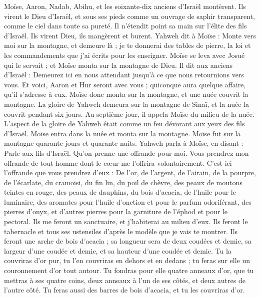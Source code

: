 \begin{multicols}{2}
Moïse, Aaron, Nadab, Abihu, et les soixante-dix anciens d'Israël montèrent.
Ils virent le Dieu d'Israël, et sous ses pieds comme un ouvrage de saphir transparent, comme le ciel dans toute sa pureté.
Il n’étendit point sa main sur l’élite des fils d'Israël. Ils virent Dieu, ils mangèrent et burent.
Yahweh dit à Moïse : Monte vers moi sur la montagne, et demeure là ; je te donnerai des tables de pierre, la loi et les commandements que j'ai écrits pour les enseigner.
Moïse se leva avec Josué qui le servait ; et Moïse monta sur la montagne de Dieu.
Il dit aux anciens d'Israël : Demeurez ici en nous attendant jusqu'à ce que nous retournions vers vous. Et voici, Aaron et Hur seront avec vous ; quiconque aura quelque affaire, qu'il s'adresse à eux.
Moïse donc monta sur la montagne, et une nuée couvrit la montagne\FTNT{}.
La gloire de Yahweh demeura sur la montagne de Sinaï, et la nuée la couvrit pendant six jours. Au septième jour, il appela Moïse du milieu de la nuée.
L’aspect de la gloire de Yahweh était comme un feu dévorant aux yeux des fils d'Israël\FTNT{}.
Moïse entra dans la nuée et monta sur la montagne. Moïse fut sur la montagne quarante jours et quarante nuits.
\VerseOne{}Yahweh parla à Moïse, en disant :
Parle aux fils d'Israël. Qu'on prenne une offrande pour moi. Vous prendrez mon offrande de tout homme dont le cœur me l'offrira volontairement.
C'est ici l'offrande que vous prendrez d'eux : De l'or, de l'argent, de l'airain,
de la pourpre, de l'écarlate, du cramoisi, du fin lin, du poil de chèvre,
des peaux de moutons teintes en rouge, des peaux de dauphins, du bois d’acacia,
de l'huile pour le luminaire, des aromates pour l'huile d'onction et pour le parfum odoriférant,
des pierres d'onyx, et d’autres pierres pour la garniture de l'éphod et pour le pectoral.
Ils me feront un sanctuaire, et j'habiterai au milieu d'eux\FTNT{}.
Ils feront le tabernacle et tous ses ustensiles d’après le modèle que je vais te montrer.
Ils feront une arche de bois d’acacia ; sa longueur sera de deux coudées et demie, sa largeur d'une coudée et demie, et sa hauteur d'une coudée et demie.
Tu la couvriras d’or pur, tu l'en couvriras en dehors et en dedans ; tu feras sur elle un couronnement d'or tout autour\FTNT{}.
Tu fondras pour elle quatre anneaux d'or, que tu mettras à ses quatre coins, deux anneaux à l'un de ses côtés, et deux autres de l'autre côté.
Tu feras aussi des barres de bois d’acacia, et tu les couvriras d'or.

\end{multicols}
